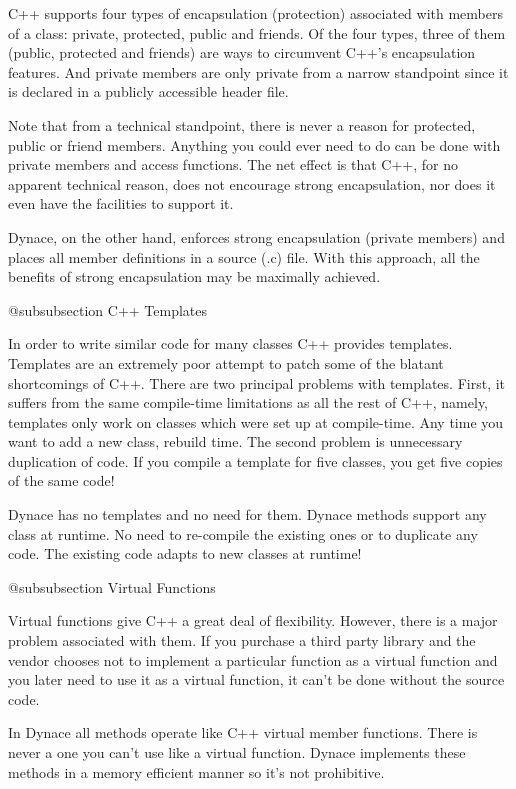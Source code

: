 C++ supports four types of encapsulation (protection) associated with
members of a class: private, protected, public and friends.  Of the
four types, three of them (public, protected and friends) are ways
to circumvent C++'s encapsulation features.  And private members are
only private from a narrow standpoint since it is declared in a
publicly accessible header file.

Note that from a technical standpoint, there is never a reason for
protected, public or friend members.  Anything you could ever need
to do can be done with private members and access functions.  The
net effect is that C++, for no apparent technical reason, does
not encourage strong encapsulation, nor does it even have the facilities
to support it.

Dynace, on the other hand, enforces strong encapsulation (private members)
and places all member definitions in a source (.c) file.  With this
approach, all the benefits of strong encapsulation may be maximally
achieved.


@subsubsection C++ Templates

In order to write similar code for many classes C++ provides
templates.  Templates are an extremely poor attempt to patch some
of the blatant shortcomings of C++.  There are two principal problems
with templates.  First, it suffers from the same compile-time limitations
as all the rest of C++, namely, templates only work on classes which
were set up at compile-time.  Any time you want to add a new class,
rebuild time.  The second problem is unnecessary duplication of code.
If you compile a template for five classes, you get five copies of the
same code!

Dynace has no templates and no need for them.  Dynace methods support any
class at runtime.  No need to re-compile the existing ones or to
duplicate any code.  The existing code adapts to new classes at
runtime!

@subsubsection Virtual Functions

Virtual functions give C++ a great deal of flexibility.  However,
there is a major problem associated with them.  If you purchase a
third party library and the vendor chooses not to implement a
particular function as a virtual function and you later need to use it
as a virtual function, it can't be done without the source code.

In Dynace all methods operate like C++ virtual member functions.  There
is never a one you can't use like a virtual function.  Dynace implements
these methods in a memory efficient manner so it's not prohibitive.

